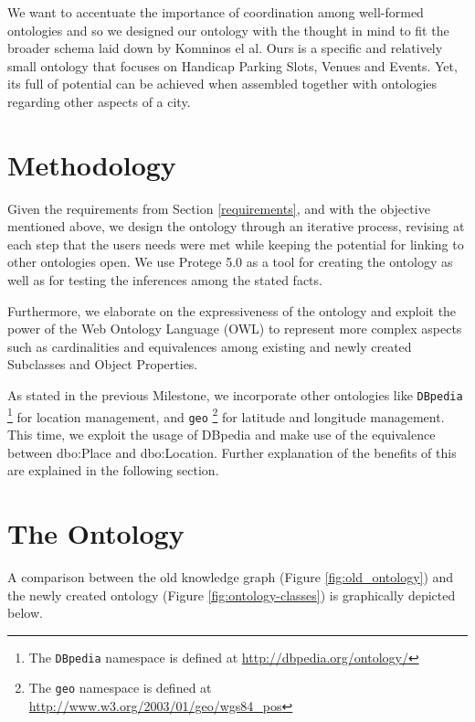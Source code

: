 \documentclass[runningheads,a4paper]{../../StyleFiles/llncs}
\begin{document}
We want to accentuate the importance of coordination among well-formed ontologies and so we designed our ontology with the thought in mind to fit the broader schema laid down by Komninos el al. Ours is a specific and relatively small ontology that focuses on Handicap Parking Slots, Venues and Events. Yet, its full of potential can be achieved when assembled together with ontologies regarding other aspects of a city. 

\section{Methodology}

Given the requirements from Section \ref{requirements}, and with the objective mentioned above, we design the ontology through an iterative process, revising at each step that the users needs were met while keeping the potential for linking to other ontologies open. We use Protege 5.0 as a tool for creating the ontology as well as for testing the inferences among the stated facts. 

Furthermore, we elaborate on the expressiveness of the ontology and exploit the power of the Web Ontology Language (OWL) to represent more complex aspects such as cardinalities and equivalences among existing and newly created Subclasses and Object Properties.

As stated in the previous Milestone, we incorporate other ontologies like \texttt{DBpedia} \footnote{The \texttt{DBpedia} namespace is defined at \url{http://dbpedia.org/ontology/}} for location management, and \texttt{geo} \footnote{The \texttt{geo} namespace is defined at \url{http://www.w3.org/2003/01/geo/wgs84_pos}} for latitude and longitude management. This time, we exploit the usage of DBpedia and make use of the equivalence between dbo:Place and dbo:Location. Further explanation of the benefits of this are explained in the following section.

\section{The Ontology}
A comparison between the old knowledge graph (Figure \ref{fig:old_ontology}) and the newly created ontology (Figure \ref{fig:ontology-classes}) is graphically depicted below. 
\end{document}
